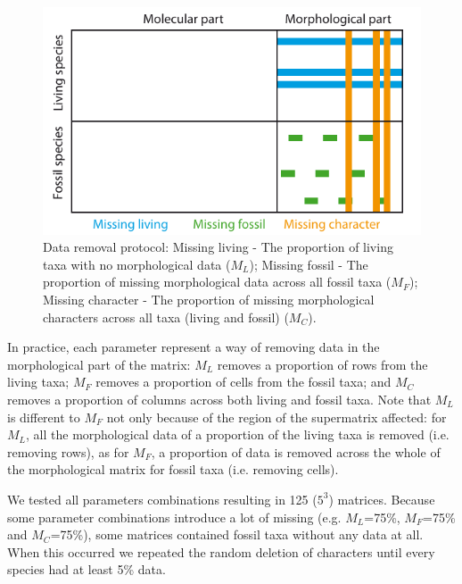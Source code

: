 \documentclass[12pt,letterpaper]{article}
\begin{document}
\begin{figure}
\centering
\includegraphics[keepaspectratio=true]{Figures/TEM_Fig_missingData.pdf}
\caption{Data removal protocol: Missing living - The proportion of living taxa with no morphological data ($M_{L}$); Missing fossil - The proportion of missing morphological data across all fossil taxa ($M_{F}$); Missing character - The proportion of missing morphological characters across all taxa (living and fossil) ($M_{C}$).}
\label{Fig_RemoveData}
\end{figure}

In practice, each parameter represent a way of removing data in the morphological part of the matrix: $M_{L}$ removes a proportion of rows from the living taxa; $M_{F}$ removes a proportion of cells from the fossil taxa; and $M_{C}$ removes a proportion of columns across both living and fossil taxa. Note that $M_{L}$ is different to $M_{F}$ not only because of the region of the supermatrix affected: for $M_{L}$, all the morphological data of a proportion of the living taxa is removed (i.e. removing rows), as for $M_{F}$, a proportion of data is removed across the whole of the morphological matrix for fossil taxa (i.e. removing cells).

We tested all parameters combinations resulting in 125 ($5^3$) matrices. Because some parameter combinations introduce a lot of missing (e.g. $M_L$=75\%, $M_F$=75\% and $M_C$=75\%), some matrices contained fossil taxa without any data at all. When this occurred we repeated the random deletion of characters until every species had at least 5\% data.
\end{document}
